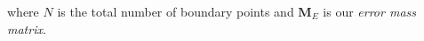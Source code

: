 where $N$ is the total number of boundary points and $\mathbf{M}_E$ is our \textit{error mass matrix}.

